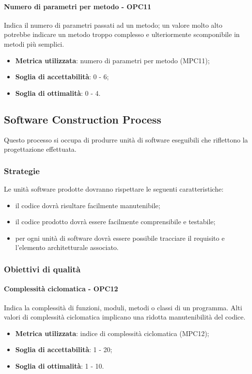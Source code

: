 \documentclass[PdQ.tex]{subfiles}
\begin{document}
			\paragraph{Numero di parametri per metodo - OPC11}
			Indica il numero di parametri passati ad un metodo; un valore molto alto potrebbe indicare un
			metodo troppo complesso e ulteriormente scomponibile in metodi più semplici.
			\begin{itemize}
				\item \textbf{Metrica utilizzata}: numero di parametri per metodo (MPC11);
				\item \textbf{Soglia di accettabilità}: 0 - 6;
				\item \textbf{Soglia di ottimalità}: 0 - 4.
			\end{itemize}
		
	\subsection{Software Construction Process}
		Questo processo si occupa di produrre unità di software eseguibili che riflettono la progettazione effettuata.
		
		\subsubsection{Strategie}
			Le unità software prodotte dovranno rispettare le seguenti caratteristiche:
			\begin{itemize}
				\item il codice dovrà risultare facilmente manutenibile;
				\item il codice prodotto dovrà essere facilmente comprensibile e testabile;
				\item per ogni unità di software dovrà essere possibile tracciare il requisito e l'elemento architetturale associato.
			\end{itemize}
			
		\subsubsection{Obiettivi di qualità}
			\paragraph{Complessità ciclomatica - OPC12}
				Indica la complessità di funzioni, moduli, metodi o classi di un programma. Alti valori di complessità ciclomatica implicano una ridotta
				manutenibilità del codice.
				\begin{itemize}
					\item \textbf{Metrica utilizzata}: indice di complessità ciclomatica (MPC12);
					\item \textbf{Soglia di accettabilità}: 1 - 20;
					\item \textbf{Soglia di ottimalità}: 1 - 10.
				\end{itemize}
			
\end{document}
